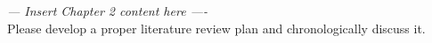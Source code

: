 \textit{--- Insert Chapter 2 content here ----} \\

Please develop a proper literature review plan and chronologically discuss it.

